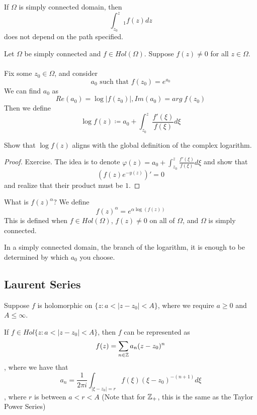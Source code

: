 \begin{remark}
If $\Omega$ is simply connected domain, then
\[\int_{z_0}^z_1 f(z) dz\]
does not depend on the path specified.
\end{remark}

\begin{definition}
    Let $\Omega$ be simply connected and $f \in Hol(\Omega)$. Suppose $f(z) \neq 0$ for all $z \in \Omega$.\\\\
    Fix some $z_0 \in \Omega$, and consider
    \[a_0 \text{ such that } f(z_0) = e^{a_0}\]
    We can find $a_0$ as
    \[Re(a_0) = \log |f(z_0)|, Im(a_0) = arg\ f(z_0)\]
    Then we define
    \[\log f(z) \coloneqq a_0 + \int_{z_0}^z \frac{f'(\xi)}{f(\xi)} d\xi\]
\end{definition}

Show that $\log f(z)$ aligns with the global definition of the complex logarithm.

\begin{proof}
Exercise. The idea is to denote $\varphi(z) = a_0 + \int_{z_0}^z \frac{f'(\xi)}{f(\xi)} d\xi$ and show that
\[(f(z) e^{-y(z)})' = 0\]
and realize that their product must be $1$.
\end{proof}

\begin{definition}
    What is $f(z)^{\alpha}$? We define
    \[f(z)^{\alpha} = e^{\alpha \log(f(z))}\]
    This is defined when $f \in Hol(\Omega)$, $f(z) \neq 0$ on all of $\Omega$, and $\Omega$ is simply connected.
\end{definition}

In a simply connected domain, the branch of the logarithm, it is enough to be determined by which $a_0$ you choose.

\subsection{Laurent Series}

Suppose $f$ is holomorphic on $\{z : a < |z - z_0| < A\}$, where we require $a \geq 0$ and $A \leq \infty$.

\begin{theorem}
If $f \in Hol\{z : a < |z - z_0| < A\}$, then $f$ can be represented as
\[f(z) = \sum_{n \in \mathbb{Z}} a_n (z - z_0)^n\]
, where we have that
\[a_n = \frac{1}{2\pi i} \int_{|\xi - z_0| = r} f(\xi) (\xi - z_0)^{-(n+1)} d\xi\]
, where $r$ is between $a < r < A$ (Note that for $\mathbb{Z}_+$, this is the same as the Taylor Power Series)
\end{theorem}

